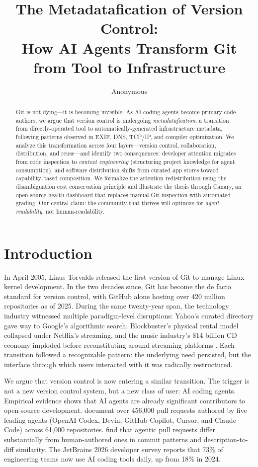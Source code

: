 \documentclass[12pt]{article}
\title{\textbf{The Metadatafication of Version Control:\\ How AI Agents Transform Git from Tool to Infrastructure}}
\author{
  Anonymous
}
\date{}
\begin{document}
\maketitle

\begin{abstract}
Git is not dying---it is becoming invisible. As AI coding agents become primary code authors, we argue that version control is undergoing \textit{metadatafication}: a transition from directly-operated tool to automatically-generated infrastructure metadata, following patterns observed in EXIF, DNS, TCP/IP, and compiler optimization. We analyze this transformation across four layers---version control, collaboration, distribution, and reuse---and identify two consequences: developer attention migrates from code inspection to \textit{context engineering} (structuring project knowledge for agent consumption), and software distribution shifts from curated app stores toward capability-based composition. We formalize the attention redistribution using the disambiguation cost conservation principle and illustrate the thesis through Canary, an open-source health dashboard that replaces manual Git inspection with automated grading. Our central claim: the community that thrives will optimize for \textit{agent-readability}, not human-readability.
\end{abstract}

\section{Introduction}

In April 2005, Linus Torvalds released the first version of Git to manage Linux kernel development. In the two decades since, Git has become the de facto standard for version control, with GitHub alone hosting over 420 million repositories as of 2025. During the same twenty-year span, the technology industry witnessed multiple paradigm-level disruptions: Yahoo's curated directory gave way to Google's algorithmic search, Blockbuster's physical rental model collapsed under Netflix's streaming, and the music industry's \$14 billion CD economy imploded before reconstituting around streaming platforms \citep{mindsetai2026saas}. Each transition followed a recognizable pattern: the underlying need persisted, but the interface through which users interacted with it was radically restructured.

We argue that version control is now entering a similar transition. The trigger is not a new version control system, but a new class of user: AI coding agents. Empirical evidence shows that AI agents are already significant contributors to open-source development. \citet{li2025rise} document over 456,000 pull requests authored by five leading agents (OpenAI Codex, Devin, GitHub Copilot, Cursor, and Claude Code) across 61,000 repositories. \citet{ogenrwot2026how} find that agentic pull requests differ substantially from human-authored ones in commit patterns and description-to-diff similarity. The JetBrains 2026 developer survey reports that 73\% of engineering teams now use AI coding tools daily, up from 18\% in 2024.
\end{document}
